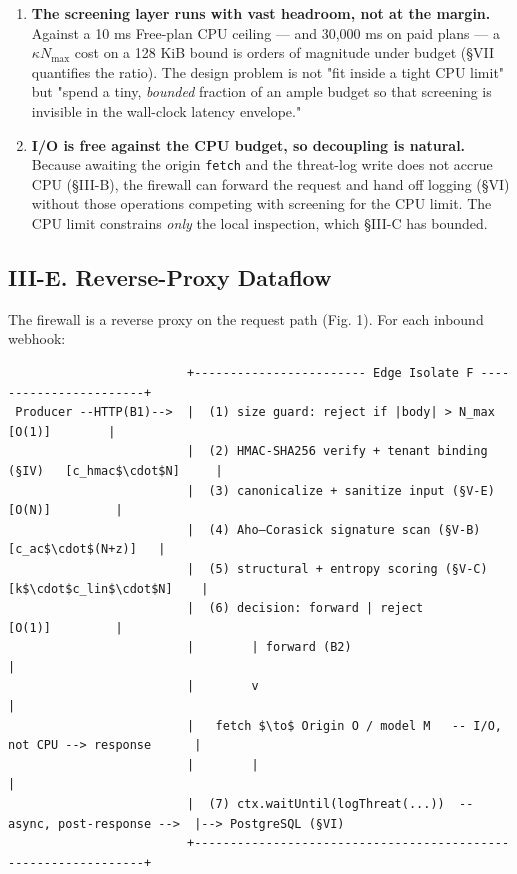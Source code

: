 \begin{enumerate}
\def\labelenumi{\arabic{enumi}.}
\tightlist
\item
  \textbf{The screening layer runs with vast headroom, not at the
  margin.} Against a 10 ms Free-plan CPU ceiling --- and 30,000 ms on
  paid plans --- a \(\kappa N_{\max}\) cost on a 128 KiB bound is orders
  of magnitude under budget (§VII quantifies the ratio). The design
  problem is not "fit inside a tight CPU limit" but "spend a tiny,
  \emph{bounded} fraction of an ample budget so that screening is
  invisible in the wall-clock latency envelope."
\item
  \textbf{I/O is free against the CPU budget, so decoupling is natural.}
  Because awaiting the origin \passthrough{\lstinline!fetch!} and the
  threat-log write does not accrue CPU (§III-B), the firewall can
  forward the request and hand off logging (§VI) without those
  operations competing with screening for the CPU limit. The CPU limit
  constrains \emph{only} the local inspection, which §III-C has bounded.
\end{enumerate}

\subsection{III-E. Reverse-Proxy
Dataflow}\label{iii-e-reverse-proxy-dataflow}

The firewall is a reverse proxy on the request path (Fig. 1). For each
inbound webhook:

\begin{lstlisting}
                         +------------------------ Edge Isolate F -----------------------+
 Producer --HTTP(B1)-->  |  (1) size guard: reject if |body| > N_max        [O(1)]        |
                         |  (2) HMAC-SHA256 verify + tenant binding (§IV)   [c_hmac$\cdot$N]     |
                         |  (3) canonicalize + sanitize input (§V-E)        [O(N)]         |
                         |  (4) Aho–Corasick signature scan (§V-B)          [c_ac$\cdot$(N+z)]   |
                         |  (5) structural + entropy scoring (§V-C)         [k$\cdot$c_lin$\cdot$N]    |
                         |  (6) decision: forward | reject                  [O(1)]         |
                         |        | forward (B2)                                            |
                         |        v                                                         |
                         |   fetch $\to$ Origin O / model M   -- I/O, not CPU --> response      |
                         |        |                                                         |
                         |  (7) ctx.waitUntil(logThreat(...))  -- async, post-response -->  |--> PostgreSQL (§VI)
                         +---------------------------------------------------------------+
\end{lstlisting}

